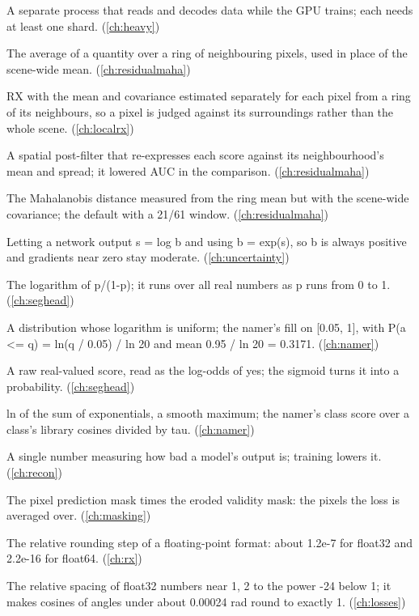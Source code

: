 \begin{description}[style=nextline,leftmargin=1.2em,font=\normalfont\bfseries]
\item[Loader worker] A separate process that reads and decodes data while the GPU trains; each needs at least one shard. (\cref{ch:heavy})
\item[Local mean] The average of a quantity over a ring of neighbouring pixels, used in place of the scene-wide mean. (\cref{ch:residualmaha})
\item[Local RX] RX with the mean and covariance estimated separately for each pixel from a ring of its neighbours, so a pixel is judged against its surroundings rather than the whole scene. (\cref{ch:localrx})
\item[Local z-score] A spatial post-filter that re-expresses each score against its neighbourhood's mean and spread; it lowered AUC in the comparison. (\cref{ch:residualmaha})
\item[Local-mean Mahalanobis distance] The Mahalanobis distance measured from the ring mean but with the scene-wide covariance; the default with a 21/61 window. (\cref{ch:residualmaha})
\item[Log parameterisation] Letting a network output s = log b and using b = exp(s), so b is always positive and gradients near zero stay moderate. (\cref{ch:uncertainty})
\item[Log-odds] The logarithm of p/(1-p); it runs over all real numbers as p runs from 0 to 1. (\cref{ch:seghead})
\item[Log-uniform distribution] A distribution whose logarithm is uniform; the namer's fill on [0.05, 1], with P(a <= q) = ln(q / 0.05) / ln 20 and mean 0.95 / ln 20 = 0.3171. (\cref{ch:namer})
\item[Logit] A raw real-valued score, read as the log-odds of yes; the sigmoid turns it into a probability. (\cref{ch:seghead})
\item[Logsumexp] ln of the sum of exponentials, a smooth maximum; the namer's class score over a class's library cosines divided by tau. (\cref{ch:namer})
\item[Loss] A single number measuring how bad a model's output is; training lowers it. (\cref{ch:recon})
\item[Loss mask] The pixel prediction mask times the eroded validity mask: the pixels the loss is averaged over. (\cref{ch:masking})
\item[Machine epsilon] The relative rounding step of a floating-point format: about 1.2e-7 for float32 and 2.2e-16 for float64. (\cref{ch:rx})
\item[Machine epsilon (float32)] The relative spacing of float32 numbers near 1, 2 to the power -24 below 1; it makes cosines of angles under about 0.00024 rad round to exactly 1. (\cref{ch:losses})

\end{description}
